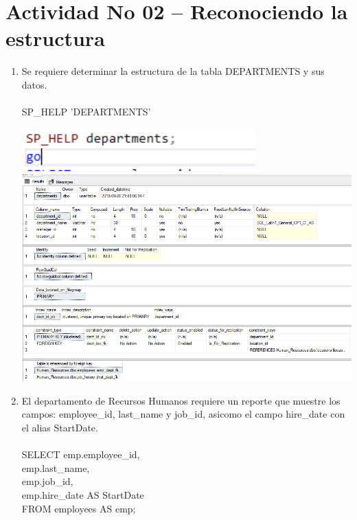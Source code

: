 \section{Actividad No 02 – Reconociendo la estructura} 

\begin{enumerate}[1.]
	\item Se requiere determinar la estructura de la tabla DEPARTMENTS y sus datos.
	\\
	\\SP\_HELP 'DEPARTMENTS'

	\begin{center}
	\includegraphics[width=9cm]{./Imagenes/actividad_02_01a} 
	\includegraphics[width=15cm]{./Imagenes/actividad_02_01} 
	\end{center}

	\item El departamento de Recursos Humanos requiere un reporte que muestre los campos: employee\_id, last\_name y job\_id, asicomo el campo hire\_date con el alias StartDate.
	\\
	\\SELECT emp.employee\_id, \\
	emp.last\_name, \\
	emp.job\_id, \\
	emp.hire\_date AS StartDate \\
	FROM employees AS emp; 


\end{enumerate}
